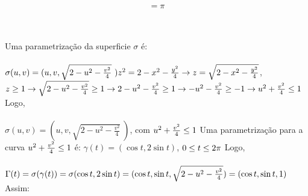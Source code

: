 \documentclass[11pt,a4paper]{article}
\begin{document}
\begin{enumerate}
{{$$		                = \pi$$\\\\
		                \item Uma parametrização da superficie $\sigma$ é:\\\\
		                $\sigma (u,v) = (u,v,\sqrt{2-u^2 - \frac{v^2}{4}} \ )\\\\
		                z^2 = 2 - x^2 - \frac{y^2}{4} \rightarrow z = \sqrt{2-x^2 -\frac{y^2}{4}}$, $z \geq 1\\\\
		                \rightarrow  \sqrt{2 - u^2 - \frac{v^2}{4}} \geq 1\\\\
		                \rightarrow 2 - u^2 -\frac{v^2}{4} \geq 1\\\\
		                \rightarrow -u^2- \frac{v^2}{4} \geq -1\\\\
		                \rightarrow u^2 + \frac{v^2}{4} \leq 1\\\\$
                        Logo, \\\\
                        $\sigma(u,v) = (u,v,\sqrt{2-u^2 - \frac{v^2}{4}} \ ) $, com $u^2 + \frac{v^2}{4} \leq 1\\\\$
                        Uma parametrização para a curva $u^2 + \frac{v^2}{4} \leq 1\\\\$ é:
                        $\gamma(t) = (\cos t,2\sin t)$, $0\leq t \leq 2\pi\\\\$
                        Logo, \\\\
                        $\Gamma(t) = \sigma(\gamma(t))\\\\
                        =\sigma(\cos t,2\sin t)\\\\
                        =(\cos t,\sin t,\sqrt{2-u^2 - \frac{v^2}{4}} )\\\\
                        =(\cos t,\sin t, 1)\\\\$
                        Assim:\\\\
}}
\end{enumerate}
\end{document}
